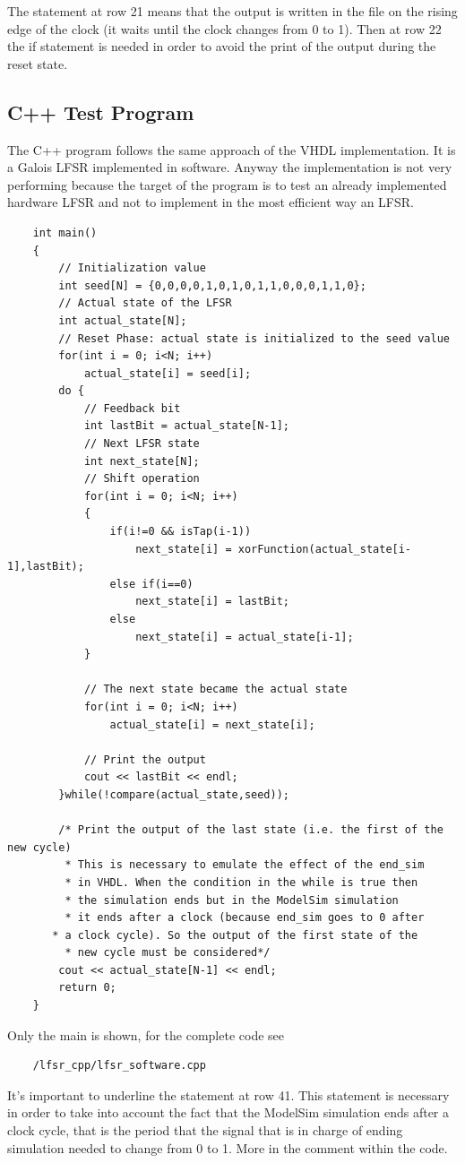 \documentclass[a4paper]{report}
\begin{document}
\noindent The statement at row 21 means that the output is written in the file on the rising edge of the clock (it waits until the clock changes from 0 to 1). Then at row 22 the if statement is needed in order to avoid the print of the output during the reset state.

\subsection{C++ Test Program}
The C++ program follows the same approach of the VHDL implementation. It is a Galois LFSR implemented in software. Anyway the implementation is not very performing because the target of the program is to test an already implemented hardware LFSR and not to implement in the most efficient way an LFSR.  
\lstset{ %
	language=C++ }
\begin{lstlisting}	
	int main()
	{
		// Initialization value
		int seed[N] = {0,0,0,0,1,0,1,0,1,1,0,0,0,1,1,0}; 
		// Actual state of the LFSR
		int actual_state[N];
		// Reset Phase: actual state is initialized to the seed value
		for(int i = 0; i<N; i++)
			actual_state[i] = seed[i];
		do {
			// Feedback bit
			int lastBit = actual_state[N-1];
			// Next LFSR state
			int next_state[N];
			// Shift operation
			for(int i = 0; i<N; i++)
			{
				if(i!=0 && isTap(i-1))
					next_state[i] = xorFunction(actual_state[i-1],lastBit);
				else if(i==0)
					next_state[i] = lastBit;
				else
					next_state[i] = actual_state[i-1];
			}
			
			// The next state became the actual state
			for(int i = 0; i<N; i++)
				actual_state[i] = next_state[i];
			
			// Print the output
			cout << lastBit << endl;
		}while(!compare(actual_state,seed));
		
		/* Print the output of the last state (i.e. the first of the new cycle)
		 * This is necessary to emulate the effect of the end_sim
		 * in VHDL. When the condition in the while is true then
		 * the simulation ends but in the ModelSim simulation
	 	 * it ends after a clock (because end_sim goes to 0 after
	   * a clock cycle). So the output of the first state of the 
	 	 * new cycle must be considered*/
		cout << actual_state[N-1] << endl;
		return 0;
	}
\end{lstlisting}

\noindent Only the main is shown, for the complete code see \begin{Verbatim}
	/lfsr_cpp/lfsr_software.cpp
\end{Verbatim}
It's important to underline the statement at row 41. This statement is necessary in order to take into account the fact that the ModelSim simulation ends after a clock cycle, that is the period that the signal that is in charge of ending simulation needed to change from 0 to 1. More in the comment within the code.
\end{document}
